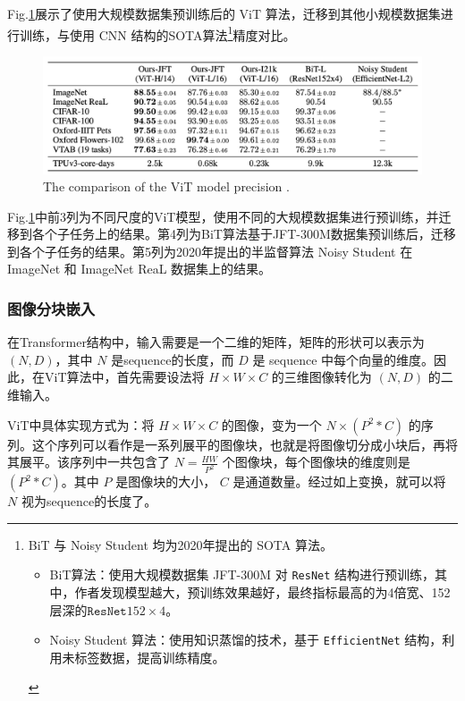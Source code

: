 \documentclass[letterpaper,10pt]{article}
\begin{document}
	Fig.\ref{fig: ViT precision}展示了使用大规模数据集预训练后的 ViT 算法，迁移到其他小规模数据集进行训练，与使用 CNN 结构的SOTA算法\footnote{BiT 与 Noisy Student 均为2020年提出的 SOTA 算法。
		\begin{itemize}
			\item {}
				BiT算法\cite{kolesnikov2020big}：使用大规模数据集 JFT-300M 对 \texttt{ResNet} 结构进行预训练，其中，作者发现模型越大，预训练效果越好，最终指标最高的为4倍宽、152层深的$\texttt{ResNet}152\times 4$。
			\item {}
				Noisy Student 算法\cite{xie2020self}：使用知识蒸馏的技术，基于 \texttt{EfficientNet} 结构，利用未标签数据，提高训练精度。
		\end{itemize}	
	}精度对比。
	
	
	\begin{figure}[htbp]
		\centering 
		\includegraphics[width=0.8\columnwidth]{picture/The ViT model precision}
		\caption{
			\label{fig: ViT precision} The comparison of the ViT model precision .
		}
	\end{figure}
	
	
	Fig.\ref{fig: ViT precision}中前3列为不同尺度的ViT模型，使用不同的大规模数据集进行预训练，并迁移到各个子任务上的结果。第4列为BiT算法基于JFT-300M数据集预训练后，迁移到各个子任务的结果。第5列为2020年提出的半监督算法 Noisy Student 在 ImageNet 和 ImageNet ReaL 数据集上的结果。
	
	\subsubsection{图像分块嵌入}
	
	在Transformer结构中，输入需要是一个二维的矩阵，矩阵的形状可以表示为$(N,D)$，其中 $N$ 是sequence的长度，而 $D$ 是 sequence 中每个向量的维度。因此，在ViT算法中，首先需要设法将 $H \times W \times C$ 的三维图像转化为 $\left( N,D \right)$ 的二维输入。
	
	ViT中具体实现方式为：将 $H \times W \times C$ 的图像，变为一个 $N \times \left( P^2 * C \right)$ 的序列。这个序列可以看作是一系列展平的图像块，也就是将图像切分成小块后，再将其展平。该序列中一共包含了 $N = \frac{HW}{P^2}$ 个图像块，每个图像块的维度则是 $\left(P^2 * C\right)$。其中 $P$ 是图像块的大小， $C$ 是通道数量。经过如上变换，就可以将 $N$ 视为sequence的长度了。
\end{document}
